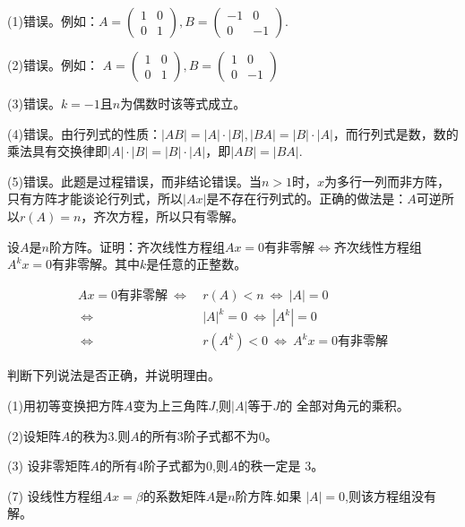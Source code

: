 \documentclass[a4paper]{report}
\begin{document}
\begin{jie}
(1)错误。例如：$A=
\begin{pmatrix}
1&0\\
0&1
\end{pmatrix}
,B=
\begin{pmatrix}
-1&0\\
0&-1
\end{pmatrix}$.

(2)错误。例如：
$
A=\begin{pmatrix}
1&0\\
0&1
\end{pmatrix},B=\begin{pmatrix}
1&0\\
0&-1
\end{pmatrix}
$

(3)错误。$k=-1$且$n$为偶数时该等式成立。

(4)错误。由行列式的性质：$|AB|=|A|\cdot|B|,|BA|=|B|\cdot |A|$，而行列式是数，数的乘法具有交换律即$|A|\cdot|B|=|B|\cdot |A|$，即$|AB|=|BA|$.

(5)错误。此题是过程错误，而非结论错误。当$n>1$时，$x$为多行一列而非方阵，只有方阵才能谈论行列式，所以$|Ax|$是不存在行列式的。正确的做法是：$A$可逆所以$r(A)=n$，齐次方程，所以只有零解。
\end{jie}

\EX 设$A$是$n$阶方阵。证明：齐次线性方程组$Ax=0$有非零解$\Leftrightarrow$齐次线性方程组$A^kx=0$有非零解。其中$k$是任意的正整数。

\begin{zhengming}
\begin{align*}
Ax=0\text{有非零解}~\Leftrightarrow~&r(A)<n~\Leftrightarrow~|A|=0\\
~\Leftrightarrow~&|A|^k=0~\Leftrightarrow~|A^k|=0\\
~\Leftrightarrow~&r(A^k)<0~\Leftrightarrow~A^{k}x=0\text{有非零解}
\end{align*}
\end{zhengming}

\EX 判断下列说法是否正确，并说明理由。

(1)用初等变换把方阵$A$变为上三角阵$J$,则$|A|$等于$J$的
全部对角元的乘积。

(2)设矩阵$A$的秩为$3$.则$A$的所有$3$阶子式都不为$0$。

(3) 设非零矩阵$A$的所有$4$阶子式都为$0$,则$A$的秩一定是
$3$。

(7) 设线性方程组$Ax= \beta$的系数矩阵$A$是$n$阶方阵.如果
$|A|=0$,则该方程组没有解。
\end{document}
